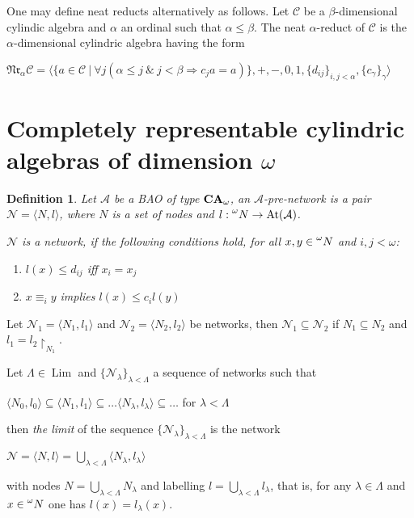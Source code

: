 \documentclass[a4paper]{article}
\theoremstyle{defin}
\newtheorem{defin}{Definition}
\theoremstyle{theorem}
\theoremstyle{prop}
\theoremstyle{lemma}
\theoremstyle{fact}
\theoremstyle{ex}
\theoremstyle{col}
\begin{document}
One may define neat reducts alternatively as follows.
Let $\mathcal{C}$ be a $\beta$-dimensional cylindic algebra and $\alpha$ an ordinal such that $\alpha \leq \beta$. The neat $\alpha$-reduct of $\mathcal{C}$ is the $\alpha$-dimensional cylindric algebra having the form

\begin{center}
  $\mathfrak{N}\mathfrak{r}_\alpha \mathcal{C} = \langle \{ a \in \mathcal{C} \: | \: \forall j (\alpha \leq j \: \& \: j < \beta \Rightarrow c_j a = a) \}, +, -, 0, 1, \{d_{ij}\}_{i,j < \alpha}, \{c_{\gamma}\}_{\gamma} \rangle$
\end{center}

\section{Completely representable cylindric algebras of dimension $\omega$}

\begin{defin} \label{network}
  Let $\mathcal{A}$ be a BAO of type ${\bf CA}_{\omega}$, an $\mathcal{A}$-pre-network is a pair
  $\mathcal{N} = \langle N, l \rangle$, where $N$ is a set of nodes and $l : \prescript{\omega}{}N \to \operatorname{At}(\mathcal{A})$.

  $\mathcal{N}$ is a network, if the following conditions hold, for all $x, y \in \prescript{\omega}{}N$ and $i, j < \omega$:
  \begin{enumerate}
    \item $l(x) \leq d_{ij}$ iff $x_i = x_j$
    \item $x \equiv_i y$ implies $l(x) \leq c_i l(y)$
  \end{enumerate}
\end{defin}

Let $\mathcal{N}_1 = \langle N_1, l_1 \rangle$ and $\mathcal{N}_2 = \langle N_2, l_2 \rangle$ be networks, then $\mathcal{N}_1 \subseteq \mathcal{N}_2$ if $N_1 \subseteq N_2$ and $l_1 = l_2 	\upharpoonright_{N_1}$.

Let $\Lambda \in \operatorname{Lim}$ and $\{ \mathcal{N}_{\lambda}\}_{\lambda < \Lambda}$ a sequence of networks such that
\begin{center}
  $\langle N_0, l_0 \rangle \subseteq \langle N_1, l_1 \rangle \subseteq \dots \langle N_{\lambda}, l_{\lambda} \rangle \subseteq \dots $ for $\lambda < \Lambda$
\end{center}
then \emph{the limit} of the sequence $\{ \mathcal{N}_{\lambda}\}_{\lambda < \Lambda}$ is the network
\begin{center}
  $\mathcal{N} = \langle N, l \rangle = \bigcup \limits_{\lambda < \Lambda} \langle N_{\lambda}, l_{\lambda} \rangle$
\end{center}
with nodes $N = \bigcup \limits_{\lambda < \Lambda} N_{\lambda}$ and labelling $l = \bigcup \limits_{\lambda < \Lambda} l_{\lambda}$, that is,
  for any $\lambda \in \Lambda$ and $x \in \prescript{\omega}{}N$ one has $l(x) = l_{\lambda}(x)$.
\end{document}
